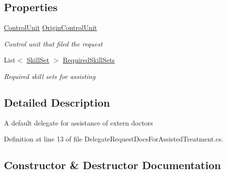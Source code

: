 \subsection*{Properties}
\begin{DoxyCompactItemize}
\item 
\hyperlink{class_simulation_core_1_1_h_c_c_m_elements_1_1_control_unit}{Control\+Unit} \hyperlink{class_general_health_care_elements_1_1_delegates_1_1_delegate_request_docs_for_assisting_abb296aacd05bb8768c3c2c8acf57e658}{Origin\+Control\+Unit}
\begin{DoxyCompactList}\small\item\em Control unit that filed the request \end{DoxyCompactList}\item 
List$<$ \hyperlink{class_simulation_core_1_1_h_c_c_m_elements_1_1_skill_set}{Skill\+Set} $>$ \hyperlink{class_general_health_care_elements_1_1_delegates_1_1_delegate_request_docs_for_assisting_a3d902f2bd7c0d6893b824e46c90409ce}{Required\+Skill\+Sets}
\begin{DoxyCompactList}\small\item\em Required skill sets for assisting \end{DoxyCompactList}\end{DoxyCompactItemize}


\subsection{Detailed Description}
A default delegate for assistance of extern doctors 



Definition at line 13 of file Delegate\+Request\+Docs\+For\+Assisted\+Treatment.\+cs.



\subsection{Constructor \& Destructor Documentation}
